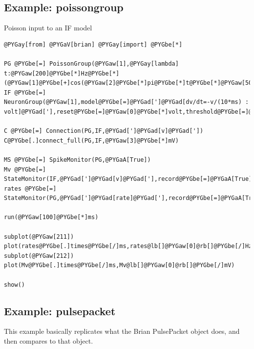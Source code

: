 \documentclass[letterpaper,10pt]{manual}
\begin{document}
\hypertarget{index-47}{}\subsection{Example: poissongroup}

Poisson input to an IF model

\begin{Verbatim}[commandchars=@\[\]]
@PYGay[from] @PYGaV[brian] @PYGay[import] @PYGbe[*]

PG @PYGbe[=] PoissonGroup(@PYGaw[1],@PYGay[lambda] t:@PYGaw[200]@PYGbe[*]Hz@PYGbe[*](@PYGaw[1]@PYGbe[+]cos(@PYGaw[2]@PYGbe[*]pi@PYGbe[*]t@PYGbe[*]@PYGaw[50]@PYGbe[*]Hz)))
IF @PYGbe[=] NeuronGroup(@PYGaw[1],model@PYGbe[=]@PYGad[']@PYGad[dv/dt=-v/(10*ms) : volt]@PYGad['],reset@PYGbe[=]@PYGaw[0]@PYGbe[*]volt,threshold@PYGbe[=]@PYGaw[10]@PYGbe[*]mV)

C @PYGbe[=] Connection(PG,IF,@PYGad[']@PYGad[v]@PYGad['])
C@PYGbe[.]connect_full(PG,IF,@PYGaw[3]@PYGbe[*]mV)

MS @PYGbe[=] SpikeMonitor(PG,@PYGaA[True])
Mv @PYGbe[=] StateMonitor(IF,@PYGad[']@PYGad[v]@PYGad['],record@PYGbe[=]@PYGaA[True])
rates @PYGbe[=] StateMonitor(PG,@PYGad[']@PYGad[rate]@PYGad['],record@PYGbe[=]@PYGaA[True])

run(@PYGaw[100]@PYGbe[*]ms)

subplot(@PYGaw[211])
plot(rates@PYGbe[.]times@PYGbe[/]ms,rates@lb[]@PYGaw[0]@rb[]@PYGbe[/]Hz)
subplot(@PYGaw[212])
plot(Mv@PYGbe[.]times@PYGbe[/]ms,Mv@lb[]@PYGaw[0]@rb[]@PYGbe[/]mV)

show()
\end{Verbatim}

\resetcurrentobjects
{}

\hypertarget{index-48}{}\subsection{Example: pulsepacket}

This example basically replicates what the Brian PulsePacket object does,
and then compares to that object.
\end{document}
